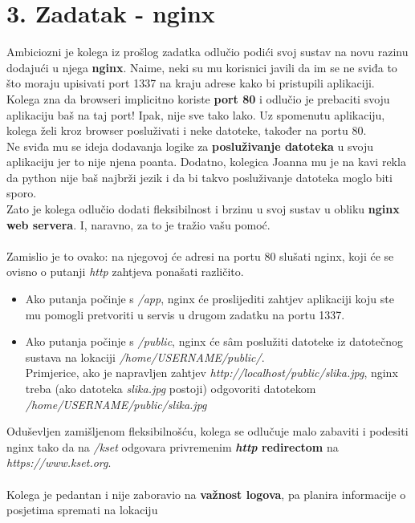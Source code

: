 \documentclass[12pt,a4paper]{article}
\begin{document}
\newpage


\section*{3. Zadatak - nginx}

Ambiciozni je kolega iz prošlog zadatka odlučio podići svoj sustav na novu razinu dodajući u njega \textbf{nginx}.
Naime, neki su mu korisnici javili da im se ne sviđa to što moraju upisivati port 1337 na kraju adrese kako bi pristupili aplikaciji.
Kolega zna da browseri implicitno koriste \textbf{port 80} i odlučio je prebaciti svoju aplikaciju baš na taj port! Ipak, nije sve tako lako.
Uz spomenutu aplikaciju, kolega želi kroz browser posluživati i neke datoteke, također na portu 80. \\
Ne sviđa mu se ideja dodavanja logike za \textbf{posluživanje datoteka} u svoju aplikaciju jer to nije njena poanta.
Dodatno, kolegica Joanna mu je na kavi rekla da python nije baš najbrži jezik i da bi takvo posluživanje datoteka moglo biti sporo.\\
Zato je kolega odlučio dodati fleksibilnost i brzinu u svoj sustav u obliku \textbf{nginx web servera}. I, naravno, za to je tražio vašu pomoć. \\
\\
Zamislio je to ovako: na njegovoj će adresi na portu 80 slušati nginx, koji će se ovisno o putanji \textit{http} zahtjeva ponašati različito. \\
\begin{itemize}
  \item Ako putanja počinje s \textit{/app}, nginx će proslijediti zahtjev aplikaciji
koju ste mu pomogli pretvoriti u servis u drugom zadatku na portu 1337. 
  \item Ako putanja počinje s \textit{/public}, nginx će sâm poslužiti datoteke iz datotečnog sustava na lokaciji \textit{/home/USERNAME/public/}. \\ 
  Primjerice, ako je napravljen zahtjev \textit{http://localhost/public/slika.jpg}, nginx treba (ako datoteka \textit{slika.jpg} postoji) odgovoriti datotekom \textit{/home/USERNAME/public/slika.jpg} \\
\end{itemize}
Oduševljen zamišljenom fleksibilnošću, kolega se odlučuje malo zabaviti i podesiti nginx
tako da na \textit{/kset} odgovara privremenim \textbf{\textit{http} redirectom} na \textit{https://www.kset.org}. \\
\\
Kolega je pedantan i nije zaboravio na \textbf{važnost logova}, pa planira informacije o posjetima spremati na lokaciju
\end{document}
